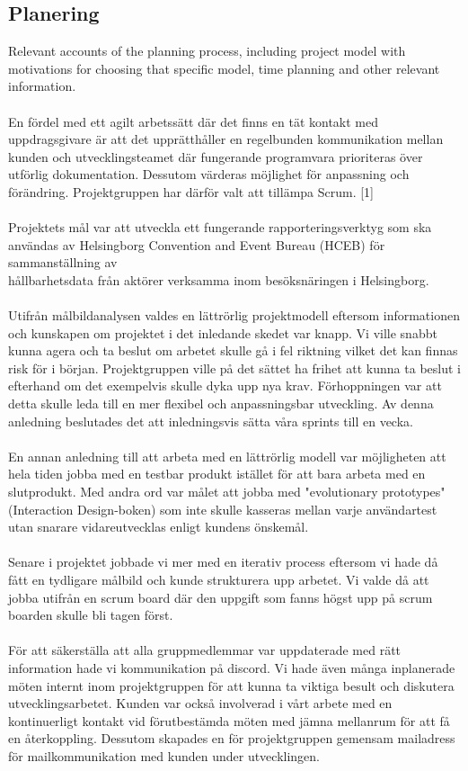 \documentclass[12pt]{article}
\begin{document}
\subsection{Planering}
Relevant accounts of the planning process, including project model with motivations for choosing that specific model, time planning and other relevant information.\\\\
En fördel med ett agilt arbetssätt där det finns en tät kontakt med uppdragsgivare är att det upprätthåller en regelbunden kommunikation mellan kunden och utvecklingsteamet där fungerande programvara prioriteras över utförlig dokumentation. Dessutom värderas möjlighet för anpassning och förändring. Projektgruppen har därför valt att tillämpa Scrum. [1] \\\\
Projektets mål var att utveckla ett fungerande rapporteringsverktyg som ska användas av Helsingborg Convention and Event Bureau (HCEB) för sammanställning av \\ hållbarhetsdata från aktörer verksamma inom besöksnäringen i Helsingborg. \\\\
Utifrån målbildanalysen valdes en lättrörlig projektmodell eftersom informationen och kunskapen om projektet i det inledande skedet var knapp. Vi ville snabbt kunna agera och ta beslut om arbetet skulle gå i fel riktning vilket det kan finnas risk för i början. Projektgruppen ville på det sättet ha frihet att kunna ta beslut i efterhand om det exempelvis skulle dyka upp nya krav. Förhoppningen var att detta skulle leda till en mer flexibel och anpassningsbar utveckling. Av denna anledning beslutades det att inledningsvis sätta våra sprints till en vecka. \\\\ 
En annan anledning till att arbeta med en lättrörlig modell var möjligheten att hela tiden jobba med en testbar produkt istället för att bara arbeta med en slutprodukt. Med andra ord var målet att jobba med "evolutionary prototypes" (Interaction Design-boken) som inte skulle kasseras mellan varje användartest utan snarare vidareutvecklas enligt kundens önskemål.\\\\
Senare i projektet jobbade vi mer med en iterativ process eftersom vi hade då fått en tydligare målbild och kunde strukturera upp arbetet. Vi valde då att jobba utifrån en scrum board där den uppgift som fanns högst upp på scrum boarden skulle bli tagen först. \\\\
För att säkerställa att alla gruppmedlemmar var uppdaterade med rätt information hade vi kommunikation på discord. Vi hade även många inplanerade möten internt inom projektgruppen för att kunna ta viktiga besult och diskutera utvecklingsarbetet. Kunden var också involverad i vårt arbete med en kontinuerligt kontakt vid förutbestämda möten med jämna mellanrum för att få en återkoppling. Dessutom skapades en för projektgruppen gemensam mailadress för mailkommunikation med kunden under utvecklingen.
\end{document}
